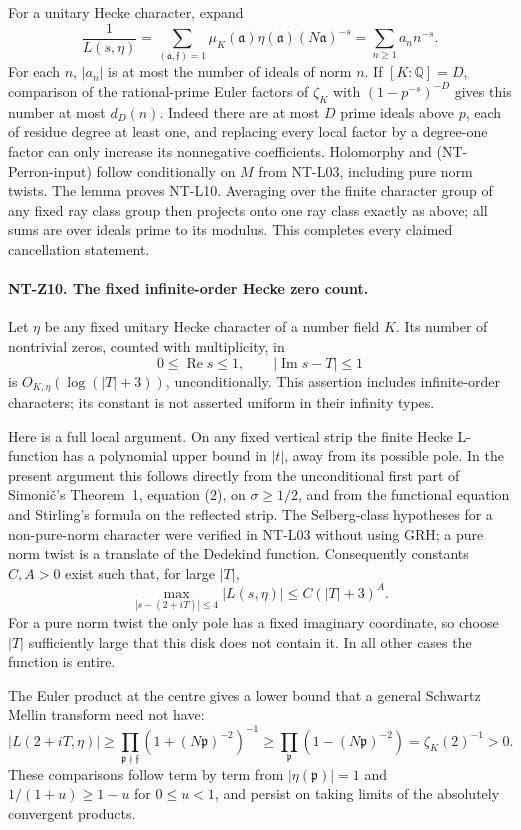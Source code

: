 For a unitary Hecke character, expand
\[
 \frac1{L(s,\eta)}
 =\sum_{(\mathfrak a,\mathfrak f)=1}
         \mu_K(\mathfrak a)\eta(\mathfrak a)(N\mathfrak a)^{-s}
 =\sum_{n\ge1}a_nn^{-s}.
\]
For each $n$, $|a_n|$ is at most the number of ideals of norm $n$.
If $[K:\mathbb Q]=D$, comparison of the rational-prime Euler factors
of $\zeta_K$ with $(1-p^{-s})^{-D}$ gives this number at most $d_D(n)$.
Indeed there are at most $D$ prime ideals above $p$, each of residue
degree at least one, and replacing every local factor by a degree-one
factor can only increase its nonnegative coefficients.  Holomorphy and
(NT-Perron-input) follow conditionally on $M$ from NT-L03, including
pure norm twists.  The lemma proves NT-L10.  Averaging over the finite
character group of any fixed ray class group then projects onto one ray
class exactly as above; all sums are over ideals prime to its modulus.
This completes every claimed cancellation statement.

\paragraph{NT-Z10. The fixed infinite-order Hecke zero count.}
Let $\eta$ be any fixed unitary Hecke character of a number field $K$.
Its number of nontrivial zeros, counted with multiplicity, in
\[
 0\le\operatorname{Re}s\le1,\qquad |\operatorname{Im}s-T|\le1
\]
is $O_{K,\eta}(\log(|T|+3))$, unconditionally.  This assertion includes
infinite-order characters; its constant is not asserted uniform in
their infinity types.

Here is a full local argument.  On any fixed vertical strip the finite
Hecke L-function has a polynomial upper bound in $|t|$, away from its
possible pole.  In the present argument this follows directly from the
unconditional first part of Simoni\v c's Theorem~1, equation (2), on
$\sigma\ge1/2$, and from the functional equation and Stirling's formula
on the reflected strip.  The Selberg-class hypotheses for a non-pure-norm
character were verified in NT-L03 without using GRH; a pure norm twist
is a translate of the Dedekind function.  Consequently constants $C,A>0$
exist such that, for large $|T|$,
\[
 \max_{|s-(2+iT)|\le4}|L(s,\eta)|\le C(|T|+3)^A.
\tag{NT-J-upper}
\]
For a pure norm twist the only pole has a fixed imaginary coordinate, so
choose $|T|$ sufficiently large that this disk does not contain it.
In all other cases the function is entire.

The Euler product at the centre gives a lower bound that a general
Schwartz Mellin transform need not have:
\[
 |L(2+iT,\eta)|
 \ge\prod_{\mathfrak p\nmid\mathfrak f}(1+(N\mathfrak p)^{-2})^{-1}
 \ge\prod_{\mathfrak p}(1-(N\mathfrak p)^{-2})
 =\zeta_K(2)^{-1}>0.
\tag{NT-J-lower}
\]
These comparisons follow term by term from $|\eta(\mathfrak p)|=1$
and $1/(1+u)\ge1-u$ for $0\le u<1$, and persist on taking limits of
the absolutely convergent products.

